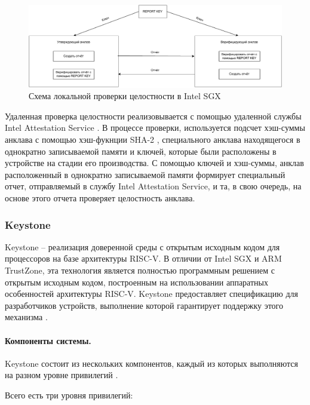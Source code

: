 \begin{figure}[h]
	\centering
	\includegraphics[width=\textwidth]{img/enclave-local-attestation.pdf}
	\caption{Схема локальной проверки целостности в Intel SGX}
	\label{fig:enclave-local-attestation}
\end{figure}

Удаленная проверка целостности реализовывается с помощью удаленной службы Intel Attestation Service \cite{intel-attestation-service}. В процессе проверки, используется подсчет хэш-суммы анклава с помощью хэш-фукнции SHA-2 \cite{sha2}, специального анклава находящегося в однократно записываемой памяти и ключей, которые были расположены в устройстве на стадии его производства. С помощью ключей и хэш-суммы, анклав расположенный в однократно записываемой памяти формирует специальный отчет, отправляемый в службу Intel Attestation Service, и та, в свою очередь, на основе этого отчета проверяет целостность анклава.

\subsubsection{Keystone}

Keystone -- реализация доверенной среды с открытым исходным кодом для процессоров на базе архитектуры RISC-V. В отличии от Intel SGX и ARM TrustZone, эта технология является полностью программным решением с открытым исходным кодом, построенным на использовании аппаратных особенностей архитектуры RISC-V. Keystone предоставляет спецификацию для разработчиков устройств, выполнение которой гарантирует поддержку этого механизма \cite{riscv-keystone}.

\paragraph{Компоненты системы.}

Keystone состоит из нескольких компонентов, каждый из которых выполняются на разном уровне привилегий \cite{keystone-overview}.

Всего есть три уровня привилегий:

